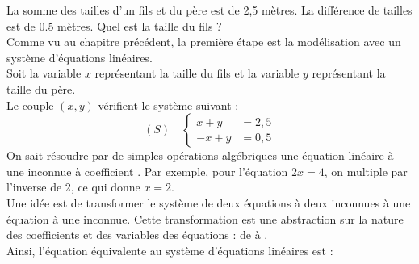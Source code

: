 \documentclass{book}
\begin{document}
\begin{Exemple}
La somme des tailles d'un fils et du père est de 2,5 mètres. La différence de tailles  est de 0.5 mètres.
Quel est la taille du fils ? \\
Comme vu au chapitre précédent, la première étape est la modélisation avec un système d'équations linéaires.\\
Soit la variable $x$ représentant la taille du fils et la variable $y$ représentant la taille du père.\\
Le couple $(x,y)$ vérifient le système suivant  :
$$(S)\quad \begin{cases}
x+y&=2,5\\
-x+y&=0,5
\end{cases}
$$
On sait résoudre par de simples opérations algébriques une équation linéaire à une inconnue à coefficient . Par exemple, pour l'équation $2x=4$, on multiple par l'inverse de 2, ce qui donne $x=2$.\\
Une idée est de transformer le système de deux équations à deux inconnues à une équation à une inconnue. Cette transformation est une abstraction sur la nature des coefficients et des variables des équations : de  à  .\\
Ainsi, l'équation équivalente au système d'équations linéaires est  :
\begin{center}
\end{center}
\end{Exemple}
\end{document}
